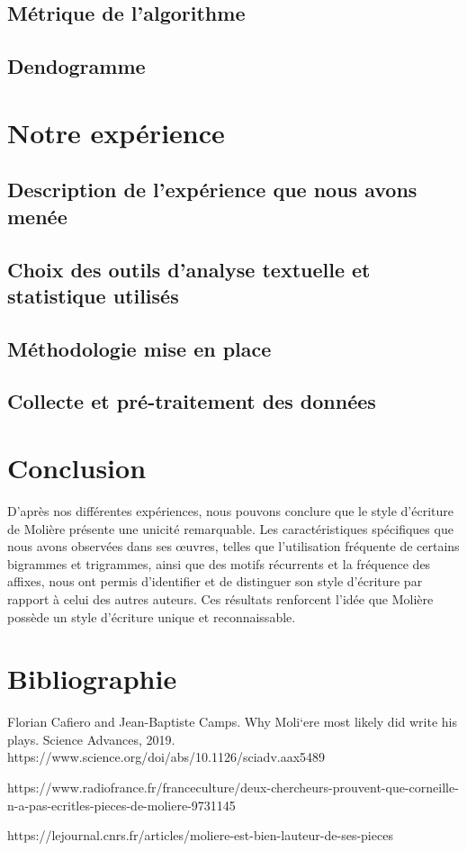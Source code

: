 \documentclass{report} %
\begin{document}
\subsection{Métrique de l'algorithme}

\subsection{Dendogramme}


\section{Notre expérience}

\vspace{\baselineskip}
\subsection{Description de l'expérience que nous avons menée}

\subsection{Choix des outils d'analyse textuelle et statistique utilisés}

\subsection{Méthodologie mise en place}

\subsection{Collecte et pré-traitement des données}


\section{Conclusion}

\hspace{0,5cm}D'après nos différentes expériences, nous
pouvons conclure que le style d'écriture de Molière présente une unicité
remarquable. Les caractéristiques spécifiques que nous avons observées dans ses
œuvres, telles que l'utilisation fréquente de certains bigrammes et trigrammes,
ainsi que des motifs récurrents et la fréquence des affixes, nous ont
permis d'identifier et de distinguer son style d'écriture par rapport à celui
des autres auteurs. Ces résultats renforcent l'idée que Molière possède un style
d'écriture unique et reconnaissable.


\section{Bibliographie}

Florian Cafiero and Jean-Baptiste Camps. Why Moli`ere most likely did write his plays.
Science Advances, 2019.
https://www.science.org/doi/abs/10.1126/sciadv.aax5489

https://www.radiofrance.fr/franceculture/deux-chercheurs-prouvent-que-corneille-n-a-pas-ecritles-pieces-de-moliere-9731145

https://lejournal.cnrs.fr/articles/moliere-est-bien-lauteur-de-ses-pieces
\end{document}
